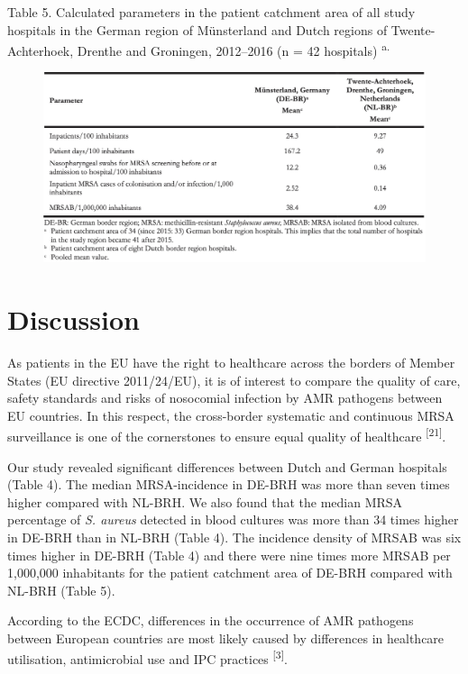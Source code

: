 \documentclass[
]{book}
\begin{document}
Table 5. Calculated parameters in the patient catchment area of all study hospitals in the German region of Münsterland and Dutch regions of Twente-Achterhoek, Drenthe and Groningen, 2012--2016 (n = 42 hospitals) \textsuperscript{a.}

\begin{figure}

{\centering \includegraphics[width=1\linewidth]{images/09-t05} 

}

\end{figure}

\hypertarget{discussion-5}{%
\section{Discussion}\label{discussion-5}}

As patients in the EU have the right to healthcare across the borders of Member States (EU directive 2011/24/EU), it is of interest to compare the quality of care, safety standards and risks of nosocomial infection by AMR pathogens between EU countries. In this respect, the cross-border systematic and continuous MRSA surveillance is one of the cornerstones to ensure equal quality of healthcare \textsuperscript{{[}21{]}}.

Our study revealed significant differences between Dutch and German hospitals (Table 4). The median MRSA-incidence in DE-BRH was more than seven times higher compared with NL-BRH. We also found that the median MRSA percentage of \emph{S. aureus} detected in blood cultures was more than 34 times higher in DE-BRH than in NL-BRH (Table 4). The incidence density of MRSAB was six times higher in DE-BRH (Table 4) and there were nine times more MRSAB per 1,000,000 inhabitants for the patient catchment area of DE-BRH compared with NL-BRH (Table 5).

According to the ECDC, differences in the occurrence of AMR pathogens between European countries are most likely caused by differences in healthcare utilisation, antimicrobial use and IPC practices \textsuperscript{{[}3{]}}.
\end{document}

